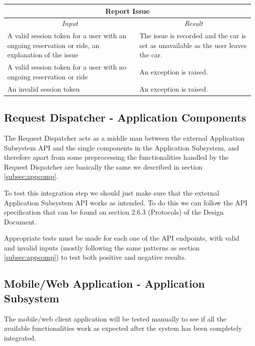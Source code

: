 \documentclass[english]{article}
\begin{document}
\begin{center}
	\begin{tabular}{ | p{6cm} | p{6cm} | }
		\hline 
		\multicolumn{2}{|c|}{\textbf{Report Issue}} \\
		\hline
		\multicolumn{1}{|c|}{\textit{Input}} & \multicolumn{1}{c|}{\textit{Result}} \\
		\hline
		A valid session token for a user with an ongoing reservation or ride, an explanation of the issue & The issue is recorded and the car is set as unavailable as the user leaves the car. \\
		\hline
		A valid session token for a user with no ongoing reservation or ride & An exception is raised. \\
		\hline
		An invalid session token & An exception is raised. \\
		\hline
	\end{tabular}
\end{center}


\subsection{Request Dispatcher - Application Components}

The Request Dispatcher acts as a middle man between the external Application Subsystem API and the single components in the Application Subsystem, and therefore apart from some preprocessing the functionalities handled by the Request Dispatcher are basically the same we described in section \ref{subsec:appcomp}.

To test this integration step we should just make sure that the external Application Subsystem API works as intended.
To do this we can follow the API specification that can be found on section 2.6.3 (Protocols) of the Design Document.

Appropriate tests must be made for each one of the API endpoints, with valid and invalid inputs (mostly following the same patterns as section \ref{subsec:appcomp}) to test both positive and negative results.

\subsection{Mobile/Web Application - Application Subsystem}

The mobile/web client application will be tested manually to see if all the available functionalities work as expected after the system has been completely integrated.
\end{document}
